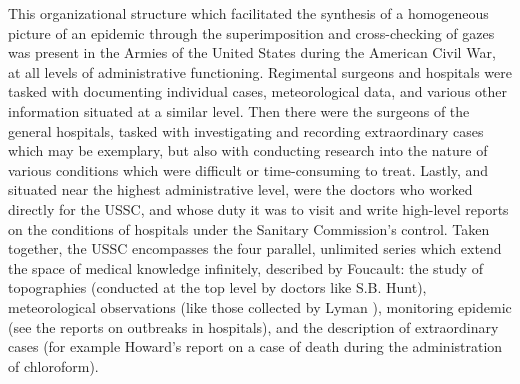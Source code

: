 \documentclass{report}
\begin{document}
  This organizational structure which facilitated the synthesis of a homogeneous picture of an epidemic through the superimposition and cross-checking 
  of gazes was present in the Armies of the United States during the American Civil War, at all levels of administrative functioning. Regimental
  surgeons and hospitals were tasked with documenting individual cases, meteorological data, and various other information situated at a similar
  level. Then there were the surgeons of the general hospitals, tasked with investigating and recording extraordinary cases which may be exemplary,
  but also with conducting research into the nature of various conditions which were difficult or time-consuming to treat. Lastly, and situated near
  the highest administrative level, were the doctors who worked directly for the USSC, and whose duty it was to visit and write high-level
  reports on the conditions of hospitals under the Sanitary Commission's control. Taken together, the USSC encompasses the four parallel,
  unlimited series which extend the space of medical knowledge infinitely, described by Foucault\autocite[pp. 28]{Foucault1994}: the study of topographies 
  (conducted at the top level by doctors like S.B. Hunt\autocite{ussc:6:0990}), meteorological observations (like those collected by Lyman 
  \autocite{ussc:6:0112}), monitoring epidemic (see the reports on outbreaks in hospitals\autocite{ussc:9:1198}), and the description of extraordinary 
  cases (for example Howard's report on a case of death during the administration of chloroform\autocite{ussc:9:0388}).

  \newpage
  \nocite{*}
  \printbibliography
\end{document}
